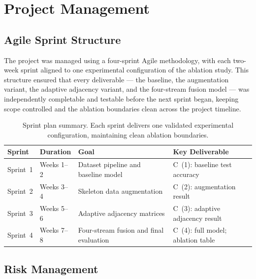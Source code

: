 \section{Project Management}
\label{sec:project-mgmt}

\subsection{Agile Sprint Structure}
\label{sec:sprints}

The project was managed using a four-sprint Agile methodology, with each two-week sprint aligned to one experimental configuration of the ablation study. This structure ensured that every deliverable --- the baseline, the augmentation variant, the adaptive adjacency variant, and the four-stream fusion model --- was independently completable and testable before the next sprint began, keeping scope controlled and the ablation boundaries clean across the project timeline.

\begin{table}[htbp]
\centering
\begin{tabular}{l l l l}
    \hline
    \textbf{Sprint} & \textbf{Duration} & \textbf{Goal} & \textbf{Key Deliverable} \\
    \hline
    Sprint~1 & Weeks 1--2 & Dataset pipeline and baseline model    & C~(1): baseline test accuracy \\
    Sprint~2 & Weeks 3--4 & Skeleton data augmentation             & C~(2): augmentation result \\
    Sprint~3 & Weeks 5--6 & Adaptive adjacency matrices            & C~(3): adaptive adjacency result \\
    Sprint~4 & Weeks 7--8 & Four-stream fusion and final evaluation & C~(4): full model; ablation table \\
    \hline
\end{tabular}
\caption{Sprint plan summary. Each sprint delivers one validated experimental configuration, maintaining clean ablation boundaries.}
\label{tab:sprints}
\end{table}

\subsection{Risk Management}
\label{sec:risk}

